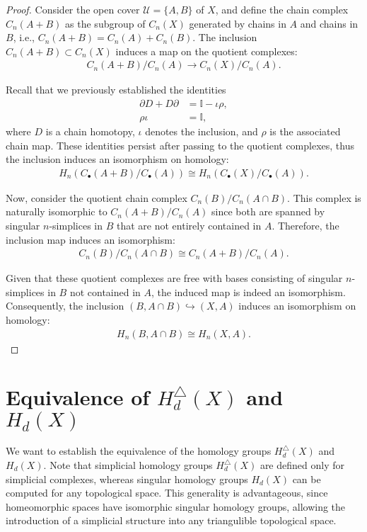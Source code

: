 \begin{proof}
	Consider the open cover \( \mathcal{U} = \{A, B\} \) of \( X \), and define the chain complex \( C_n(A + B) \) as the subgroup of \( C_n(X) \) generated by chains in \( A \) and chains in \( B \), i.e., \( C_n(A + B) = C_n(A) + C_n(B) \). The inclusion \( C_n(A + B) \subset C_n(X) \) induces a map on the quotient complexes:
	\begin{align}
		C_n(A + B)/C_n(A) \to C_n(X)/C_n(A). 
	\end{align}
		
	Recall that we previously established the identities
	\begin{align}
		\partial D + D\partial & = \mathbb{I} - \iota\rho, \\
		\rho\iota              & = \mathbb{I},             
	\end{align}
	where \( D \) is a chain homotopy, \( \iota \) denotes the inclusion, and \( \rho \) is the associated chain map. These identities persist after passing to the quotient complexes, thus the inclusion induces an isomorphism on homology:
	\begin{align}
		H_n(C_\bullet(A + B)/C_\bullet(A)) \cong H_n(C_\bullet(X)/C_\bullet(A)). 
	\end{align}
		
	Now, consider the quotient chain complex \( C_n(B)/C_n(A \cap B) \). This complex is naturally isomorphic to \( C_n(A + B)/C_n(A) \) since both are spanned by singular \( n \)-simplices in \( B \) that are not entirely contained in \( A \). Therefore, the inclusion map induces an isomorphism:
	\begin{align}
		C_n(B)/C_n(A \cap B) \cong C_n(A + B)/C_n(A). 
	\end{align}
		
	Given that these quotient complexes are free with bases consisting of singular \( n \)-simplices in \( B \) not contained in \( A \), the induced map is indeed an isomorphism. Consequently, the inclusion \( (B, A \cap B) \hookrightarrow (X, A) \) induces an isomorphism on homology:
	\begin{align}
		H_n(B, A \cap B) \cong H_n(X, A). 
	\end{align}
\end{proof}

\section{Equivalence of $H_{d}^{\triangle}(X)$ and $H_{d}(X)$}
\label{HomologicalEquivalence}
We want to establish the equivalence of the homology groups $H^{\triangle}_{d}(X)$ and $H_{d}(X)$. Note that simplicial homology groups $H^{\triangle}_{d}(X)$ are defined only for simplicial complexes, whereas singular homology groups $H_{d}(X)$ can be computed for any topological space. This generality is advantageous, since homeomorphic spaces have isomorphic singular homology groups, allowing the introduction of a simplicial structure into any triangulible topological space.

